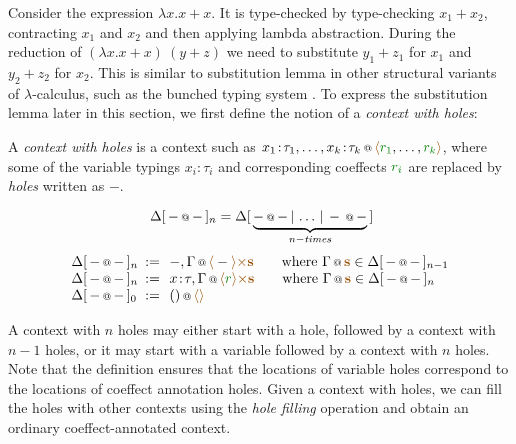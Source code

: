 Consider the expression $\lambda x.x+x$. It is type-checked by type-checking $x_1 + x_2$,
contracting $x_1$ and $x_2$ and then applying lambda abstraction. During the reduction of 
$(\lambda x.x+x)~(y+z)$ we need to substitute $y_1+z_1$ for $x_1$ and $y_2+z_2$ for $x_2$.
This is similar to substitution lemma in other structural variants of $\lambda$-calculus,
such as the bunched typing system \cite{substruct-bunched}. To express the substitution 
lemma later in this section, we first define the notion of a \emph{context with holes}:

\begin{definition}
A \emph{context with holes} is a context such as $\coctx{x_1\!:\!\tau_1, \ldots, x_k\!:\!\tau_k}{\alift{\cclrd{r_1}, \ldots, \cclrd{r_k}}}$,
where some of the variable typings $x_i\!:\!\tau_i$ and corresponding coeffects $\cclrd{r_i}$ 
are replaced by \emph{holes} written as $-$.

\begin{equation*}
~\Delta[\,\coctx{-}{-}\,]_n = \Delta[\,\underbrace{\coctx{-}{-} \,|\, \ldots \,|\, \coctx{-}{-}}_{ n-\textit{times} } \,]
\end{equation*}
\begin{equation*}
\begin{array}{lcl}
 \Delta[\,\coctx{-}{-}\,]_n &\narrow{:=}&
   \coctx{-, \Gamma}{\alift{-} \atimes \aclrd{\textbf{s}} }
   \qquad \textnormal{where}~\coctx{\Gamma}{\aclrd{\textbf{s}}} \in \Delta[\,\coctx{-}{-}\,]_{n-1} \\
 \Delta[\,\coctx{-}{-}\,]_n &\narrow{:=}&
   \coctx{x\!:\!\tau, \Gamma}{\alift{\cclrd{r}} \atimes \aclrd{\textbf{s}} }
   \qquad \textnormal{where}~\coctx{\Gamma}{\aclrd{\textbf{s}}} \in \Delta[\,\coctx{-}{-}\,]_n \\
 \Delta[\,\coctx{-}{-}\,]_0 &\narrow{:=}&
   \coctx{()}{\alift{}}
\end{array} 
\end{equation*} 
\end{definition}

\noindent
A context with $n$ holes may either start with a hole, followed by a context with $n-1$ holes, or it may
start with a variable followed by a context with $n$ holes. Note that the definition ensures that
the locations of variable holes correspond to the locations of coeffect annotation holes. Given a context
with holes, we can fill the holes with other contexts using the \emph{hole filling} operation and
obtain an ordinary coeffect-annotated context.

